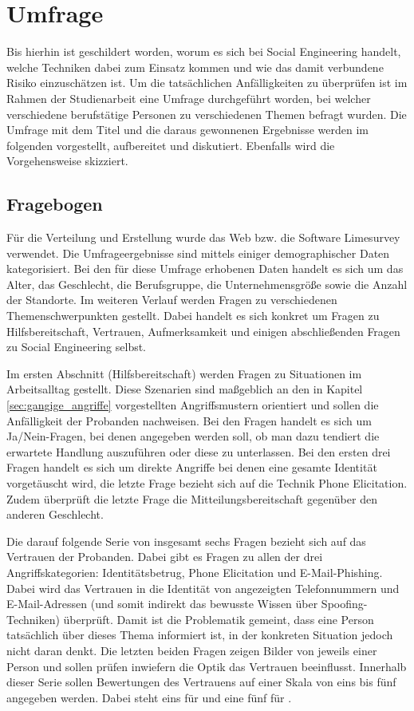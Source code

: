 \section{Umfrage}\label{sec:umfrage}
Bis hierhin ist geschildert worden, worum es sich bei Social Engineering handelt, welche Techniken dabei zum Einsatz kommen und wie das damit verbundene Risiko einzuschätzen ist.
Um die tatsächlichen Anfälligkeiten zu überprüfen ist im Rahmen der Studienarbeit eine Umfrage durchgeführt worden, bei welcher verschiedene berufstätige Personen zu verschiedenen Themen befragt wurden.
Die Umfrage mit dem Titel  und die daraus gewonnenen Ergebnisse werden im folgenden vorgestellt, aufbereitet und diskutiert.
Ebenfalls wird die Vorgehensweise skizziert.

\subsection{Fragebogen}
Für die Verteilung und Erstellung wurde das Web bzw. die Software Limesurvey verwendet.
Die Umfrageergebnisse sind mittels einiger demographischer Daten kategorisiert.
Bei den für diese Umfrage erhobenen Daten handelt es sich um das Alter, das Geschlecht, die Berufsgruppe, die Unternehmensgröße sowie die Anzahl der Standorte.
Im weiteren Verlauf werden Fragen zu verschiedenen Themenschwerpunkten gestellt.
Dabei handelt es sich konkret um Fragen zu Hilfsbereitschaft, Vertrauen, Aufmerksamkeit und einigen abschließenden Fragen zu Social Engineering selbst.

Im ersten Abschnitt (Hilfsbereitschaft) werden Fragen zu Situationen im Arbeitsalltag gestellt.
Diese Szenarien sind maßgeblich an den in Kapitel \ref{sec:gangige_angriffe} vorgestellten Angriffsmustern orientiert und sollen die Anfälligkeit der Probanden nachweisen.
Bei den Fragen handelt es sich um Ja/Nein-Fragen, bei denen angegeben werden soll, ob man dazu tendiert die erwartete Handlung auszuführen oder diese zu unterlassen.
Bei den ersten drei Fragen handelt es sich um direkte Angriffe bei denen eine gesamte Identität vorgetäuscht wird, die letzte Frage bezieht sich auf die Technik Phone Elicitation.
Zudem überprüft die letzte Frage die Mitteilungsbereitschaft gegenüber den anderen Geschlecht.

Die darauf folgende Serie von insgesamt sechs Fragen bezieht sich auf das Vertrauen der Probanden.
Dabei gibt es Fragen zu allen der drei Angriffskategorien: Identitätsbetrug, Phone Elicitation und E-Mail-Phishing.
Dabei wird das Vertrauen in die Identität von angezeigten Telefonnummern und E-Mail-Adressen (und somit indirekt das bewusste Wissen über Spoofing-Techniken) überprüft.
Damit ist die Problematik gemeint, dass eine Person tatsächlich über dieses Thema informiert ist, in der konkreten Situation jedoch nicht daran denkt.
Die letzten beiden Fragen zeigen Bilder von jeweils einer Person und sollen prüfen inwiefern die Optik das Vertrauen beeinflusst.
Innerhalb dieser Serie sollen Bewertungen des Vertrauens auf einer Skala von eins bis fünf angegeben werden.
Dabei steht eins für  und eine fünf für .

